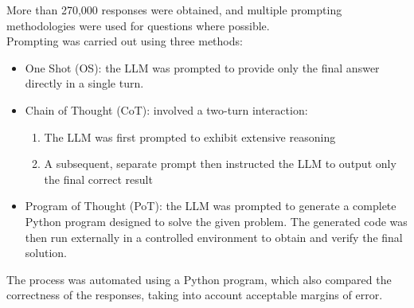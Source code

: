 \documentclass[12pt]{article}
\begin{document}
More than 270,000 responses were obtained, and multiple prompting methodologies were used for questions where possible.\\
Prompting was carried out using three methods:
\begin{itemize}
	\item One Shot (OS): the LLM was prompted to provide only the final answer directly in a single turn.\\
	\item Chain of Thought (CoT): involved a two-turn interaction:
	\begin{enumerate}
		\item The LLM was first prompted to exhibit extensive reasoning
		\item A subsequent, separate prompt then instructed the LLM to output only the final correct result
	\end{enumerate}
	\item Program of Thought (PoT): the LLM was prompted to generate a complete Python program designed to solve the given problem. The generated code was then run externally in a controlled environment to obtain and verify the final solution.\\
\end{itemize}

The process was automated using a Python program, which also compared the correctness of the responses, taking into account acceptable margins of error.\\
        
\end{document}
